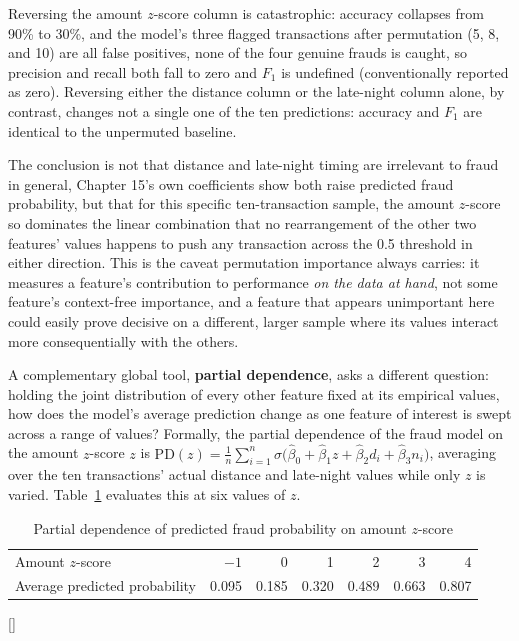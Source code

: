 \documentclass[../ai_in_finance]{subfiles}
\begin{document}
Reversing the amount $z$-score column is catastrophic: accuracy collapses from 90\% to 30\%, and the model's three flagged transactions after permutation (5, 8, and 10) are all false positives, none of the four genuine frauds is caught, so precision and recall both fall to zero and $F_1$ is undefined (conventionally reported as zero). Reversing either the distance column or the late-night column alone, by contrast, changes not a single one of the ten predictions: accuracy and $F_1$ are identical to the unpermuted baseline.

The conclusion is not that distance and late-night timing are irrelevant to fraud in general, Chapter 15's own coefficients show both raise predicted fraud probability, but that for this specific ten-transaction sample, the amount $z$-score so dominates the linear combination that no rearrangement of the other two features' values happens to push any transaction across the 0.5 threshold in either direction. This is the caveat permutation importance always carries: it measures a feature's contribution to performance \emph{on the data at hand}, not some feature's context-free importance, and a feature that appears unimportant here could easily prove decisive on a different, larger sample where its values interact more consequentially with the others.

A complementary global tool, \textbf{partial dependence}, asks a different question: holding the joint distribution of every other feature fixed at its empirical values, how does the model's average prediction change as one feature of interest is swept across a range of values? Formally, the partial dependence of the fraud model on the amount $z$-score $z$ is $\text{PD}(z) = \frac{1}{n}\sum_{i=1}^n \sigma\big(\hat\beta_0 + \hat\beta_1 z + \hat\beta_2 d_i + \hat\beta_3 n_i\big)$, averaging over the ten transactions' actual distance and late-night values while only $z$ is varied. Table~\ref{tab:partial_dependence} evaluates this at six values of $z$.

\begin{table}[htbp]
\centering
\begin{lrbox}{\bookmeasuredbox}
\begin{tabular}{lrrrrrr}
\toprule
Amount $z$-score & $-1$ & 0 & 1 & 2 & 3 & 4 \\
Average predicted probability & 0.095 & 0.185 & 0.320 & 0.489 & 0.663 & 0.807 \\
\bottomrule
\end{tabular}
\end{lrbox}
\ifdim\wd\bookmeasuredbox<0.65\linewidth
\setlength{\bookcapwidth}{0.65\linewidth}
\else
\setlength{\bookcapwidth}{\wd\bookmeasuredbox}
\fi
{}[\bookcapwidth]{
\usebox{\bookmeasuredbox}
}{
\caption{Partial dependence of predicted fraud probability on amount $z$-score}
\label{tab:partial_dependence}
}
\end{table}
\end{document}
